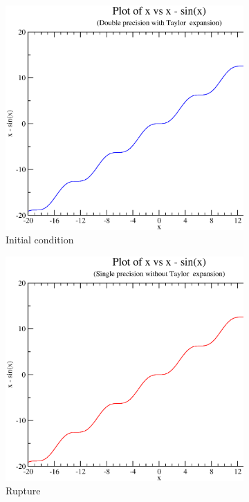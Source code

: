 \documentclass{article}
\begin{document}
\begin{figure}[ht] 
  \begin{subfigure}[b]{0.5\linewidth}
    \centering
    \includegraphics[width=0.75\linewidth]{images/a.eps} 
    \caption{Initial condition} 
    \label{fig7:a} 
    \vspace{4ex}
  \end{subfigure}%
  \begin{subfigure}[b]{0.5\linewidth}
    \centering
    \includegraphics[width=0.75\linewidth]{images/b.eps} 
    \caption{Rupture} 
    \label{fig7:b} 
    \vspace{4ex}
  \end{subfigure} 
  \begin{subfigure}[b]{0.5\linewidth}

\end{subfigure}
\end{figure}
\end{document}
